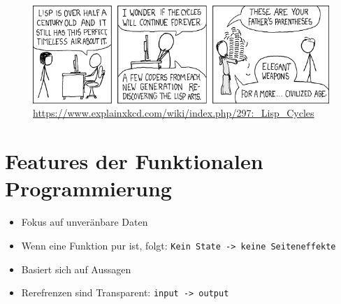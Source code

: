 \documentclass{beamer}
\def\code#1{\texttt{#1}}
\begin{document}
\begin{frame}
	\begin{figure}
	    \centering
	    \includegraphics[width=1\linewidth]{bilder/lisp_cycles.png}
        \textmd{ \tiny \url{https://www.explainxkcd.com/wiki/index.php/297:_Lisp_Cycles}}
	\end{figure}
\end{frame}


\section{Features der Funktionalen Programmierung}
\begin{frame}
	\begin{itemize}
		\item Fokus auf unveränbare Daten
            \item Wenn eine Funktion pur ist, folgt: \code{Kein State -> keine Seiteneffekte}
            \item Basiert sich auf Aussagen
            \item Rerefrenzen sind Transparent:   \code{input -> output}
	\end{itemize}
\end{frame}
\end{document}
